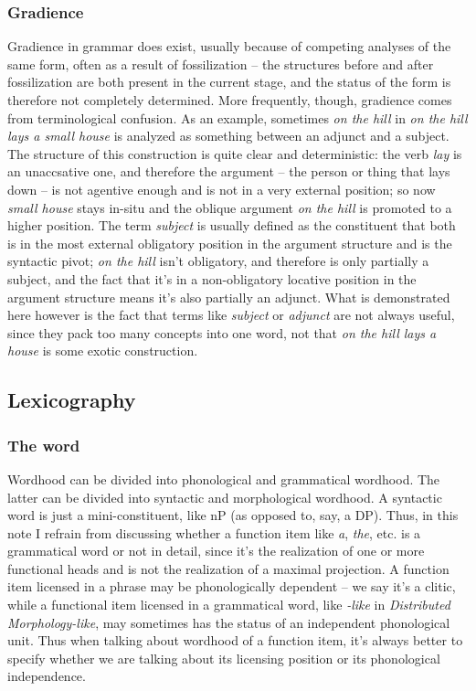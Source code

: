 \documentclass[UTF8, a4paper, oneside, scheme=plain, 12pt]{ctexbook}
\newcommand*{\term}[1]{\emph{#1}}
\newcommand{\form}[1]{\emph{#1}}
\begin{document}
{\subsubsection{Gradience}

Gradience in grammar does exist, 
usually because of competing analyses of the same form, 
often as a result of fossilization -- 
the structures before and after fossilization are both present 
in the current stage, 
and the status of the form is therefore not completely determined. 
More frequently, though, gradience comes from 
terminological confusion.
As an example, sometimes \form{on the hill} in 
\form{on the hill lays a small house}
is analyzed as something between an adjunct and a subject.
The structure of this construction is quite clear and deterministic:
the verb \form{lay} is an unaccsative one, 
and therefore the argument -- the person or thing that lays down -- 
is not agentive enough and is not in a very external position;
so now \form{small house} stays in-situ 
and the oblique argument \form{on the hill} is promoted to a higher position. 
The term \term{subject} is usually defined as 
the constituent that both is in  
the most external obligatory position in the argument structure 
and is the syntactic pivot; 
\form{on the hill} isn't obligatory, 
and therefore is only partially a subject, 
and the fact that it's in a non-obligatory locative position in the argument structure 
means it's also partially an adjunct. 
What is demonstrated here however is the fact that 
terms like \term{subject} or \term{adjunct} 
are not always useful, since they pack too many concepts into one word, 
not that \form{on the hill lays a house} is some exotic construction.

\subsection{Lexicography}

\subsubsection{The word}\label{sec:theory.word}

Wordhood can be divided into phonological and grammatical wordhood.
The latter can be divided into syntactic and morphological wordhood.
A syntactic word is just a mini-constituent,
like nP (as opposed to, say, a DP).
Thus, in this note I refrain from discussing whether a function item 
like \form{a}, \form{the}, etc. 
is a grammatical word or not in detail,
since it's the realization of one or more functional heads
and is not the realization of a maximal projection.
A function item licensed in a phrase
may be phonologically dependent -- we say it's a clitic,
while a functional item licensed in a grammatical word, 
like \form{-like} in \form{Distributed Morphology-like},
may sometimes has the status of an independent phonological unit.
Thus when talking about wordhood of a function item,
it's always better to specify whether we are talking about its 
licensing position or its phonological independence.

}
\end{document}

